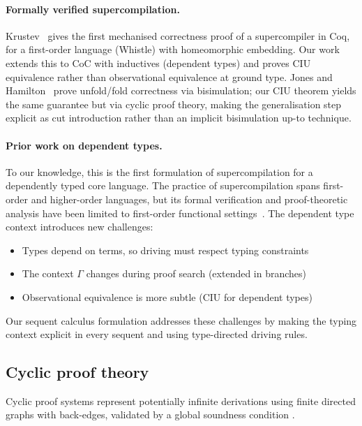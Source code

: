 \paragraph{Formally verified supercompilation.}
Krustev~\cite{krustev-2014-simple-sc-coq,krustev-2018-sc-flia} gives the first mechanised correctness proof of a supercompiler in Coq, for a first-order language (Whistle) with homeomorphic embedding.  Our work extends this to CoC with inductives (dependent types) and proves CIU equivalence rather than observational equivalence at ground type.  Jones and Hamilton~\cite{jones-hamilton-2006-bisimulation} prove unfold/fold correctness via bisimulation; our CIU theorem yields the same guarantee but via cyclic proof theory, making the generalisation step explicit as cut introduction rather than an implicit bisimulation up-to technique.

\paragraph{Prior work on dependent types.}
To our knowledge, this is the first formulation of supercompilation for a dependently typed core language.
The practice of supercompilation spans first-order and higher-order languages,
but its formal verification and proof-theoretic analysis have been limited
to first-order functional settings~\cite{sorensen-gluck-1995-supercompilation,jonesbook-1996-partial-evaluation}.
The dependent type context introduces new challenges:
\begin{itemize}
\item Types depend on terms, so driving must respect typing constraints
\item The context $\Gamma$ changes during proof search (extended in branches)
\item Observational equivalence is more subtle (CIU for dependent types)
\end{itemize}

Our sequent calculus formulation addresses these challenges by making the typing context explicit in every sequent and using type-directed driving rules.

\subsection{Cyclic proof theory}

Cyclic proof systems represent potentially infinite derivations using finite directed graphs with back-edges, validated by a global soundness condition \cite{brotherston-2006-cyclic,brotherston-simpson-2011-sequent}.

